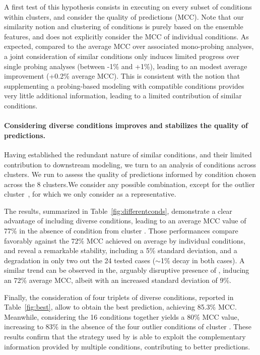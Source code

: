 \documentclass[a4,center,fleqn]{NAR}
\begin{document}
A first test of this hypothesis consists in executing \OurTool{} on every subset of conditions within clusters, and consider the quality of predictions (MCC). 
Note that our similarity notion and clustering of conditions is purely based on the ensemble features, and does not explicitly consider the MCC of individual conditions. 
As expected, compared to the average MCC over associated mono-probing analyses, a joint consideration of similar conditions only induces limited progress over single probing analyses (between -1\% and +1\%), leading to an modest average improvement (+0.2\% average MCC). This is consistent with the notion that supplementing a probing-based modeling with compatible conditions provides very little additional information, leading to a limited contribution of similar conditions. 



\paragraph{Considering diverse conditions improves and stabilizes the quality of predictions.} 
Having established the redundant nature of similar conditions, and their limited contribution to downstream modeling, we turn to an analysis of conditions across clusters.  We run \OurTool{} to assess the quality of predictions informed by condition chosen across the 8 clusters.We consider any possible combination, except for the outlier cluster~, for which we only consider \NAICE as a representative.

The results, summarized in Table~\ref{fig:differentconds}, demonstrate a clear advantage of including diverse conditions, leading to an average MCC value of 77\% in the absence of condition from cluster . Those performances compare favorably against the 72\% MCC achieved on average by individual conditions, and reveal a remarkable stability, including a 5\% standard deviation, and a degradation in only two out the 24 tested cases ($\sim$1\% decay in both cases).  A similar trend can be observed in the, arguably disruptive presence of \NAICE, inducing an 72\% average MCC, albeit with an increased standard deviation of 9\%.

Finally, the consideration of four triplets of diverse conditions, reported in Table~\ref{fig:best}, allow to obtain the best prediction, achieving 85.3\% MCC. Meanwhile, considering the 16 conditions together yields a 80\% MCC value, increasing to 83\% in the absence of the four outlier conditions of cluster . These results confirm that the strategy used by \OurTool{} is able to exploit the complementary information provided by multiple conditions, contributing to better predictions.
\end{document}
